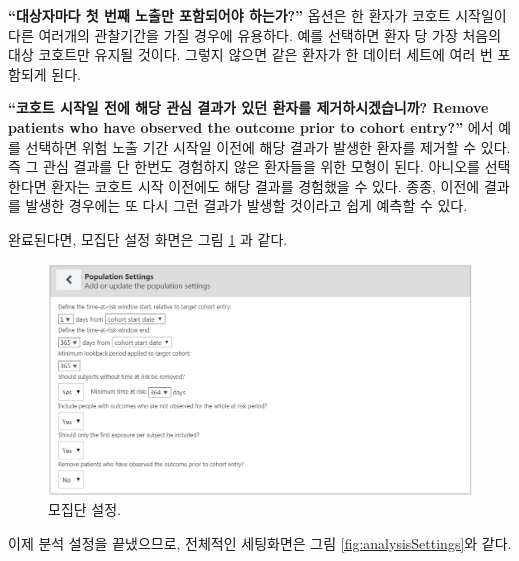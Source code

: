 \documentclass[10.5pt]{book}
\theoremstyle{definition}
\theoremstyle{definition}
\theoremstyle{definition}
\theoremstyle{remark}
\begin{document}
\textbf{``대상자마다 첫 번째 노출만 포함되어야 하는가?''} 옵션은 한
환자가 코호트 시작일이 다른 여러개의 관찰기간을 가질 경우에 유용하다.
예를 선택하면 환자 당 가장 처음의 대상 코호트만 유지될 것이다. 그렇지
않으면 같은 환자가 한 데이터 세트에 여러 번 포함되게 된다.

\textbf{``코호트 시작일 전에 해당 관심 결과가 있던 환자를
제거하시겠습니까? Remove patients who have observed the outcome prior to
cohort entry?''} 에서 예를 선택하면 위험 노출 기간 시작일 이전에 해당
결과가 발생한 환자를 제거할 수 있다. 즉 그 관심 결과를 단 한번도
경험하지 않은 환자들을 위한 모형이 된다. 아니오를 선택한다면 환자는
코호트 시작 이전에도 해당 결과를 경험했을 수 있다. 종종, 이전에 결과를
발생한 경우에는 또 다시 그런 결과가 발생할 것이라고 쉽게 예측할 수 있다.

완료된다면, 모집단 설정 화면은 그림 \ref{fig:populationSettings} 과
같다.

\begin{figure}

{\centering \includegraphics[width=1\linewidth]{images/PatientLevelPrediction/populationSettings} 

}

\caption{모집단 설정.}\label{fig:populationSettings}
\end{figure}

이제 분석 설정을 끝냈으므로, 전체적인 세팅화면은 그림
\ref{fig:analysisSettings}와 같다.
\end{document}
